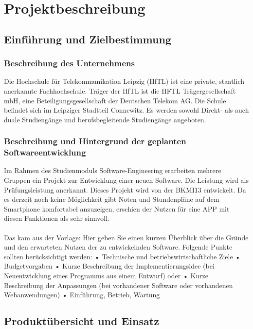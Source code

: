 \section{Projektbeschreibung}

\subsection{Einführung und Zielbestimmung}

\subsubsection{Beschreibung des Unternehmens}
Die Hochschule für Telekommunikation Leipzig (HfTL) ist eine private, staatlich anerkannte Fachhochschule. Träger der HfTL ist die HFTL Trägergesellschaft mbH, eine Beteiligungsgesellschaft der Deutschen Telekom AG. Die Schule befindet sich im Leipziger Stadtteil Connewitz. Es werden sowohl Direkt- als auch duale Studiengänge und berufsbegleitende Studiengänge angeboten.

\subsubsection{Beschreibung und Hintergrund der geplanten Softwareentwicklung}
Im Rahmen des Studienmoduls Software-Engineering erarbeiten mehrere Gruppen ein Projekt zur Entwicklung einer neuen Software. Die Leistung wird als Prüfungsleistung anerkannt.
Dieses Projekt wird von der BKMI13 entwickelt. Da es derzeit noch keine Möglichkeit gibt Noten und Stundenpläne auf dem Smartphone komfortabel anzuzeigen, erschien der Nutzen für eine APP mit diesen Funktionen als sehr sinnvoll.
\\
\\
Das kam aus der Vorlage:
Hier geben Sie einen kurzen Überblick über die Gründe und den erwarteten Nutzen der zu entwickelnden Software. Folgende Punkte sollten berücksichtigt werden:
•	Technische und betriebswirtschaftliche Ziele
•	Budgetvorgaben 
•	Kurze Beschreibung der Implementierungsidee (bei Neuentwicklung eines Programms aus einem Entwurf) oder 
•	Kurze Beschreibung der Anpassungen (bei vorhandener Software oder vorhandenen Webanwendungen)
•	Einführung, Betrieb, Wartung 


 
\subsection{Produktübersicht und Einsatz}

